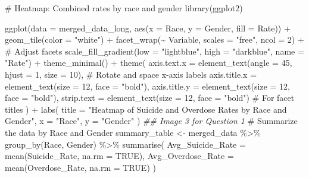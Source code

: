 \documentclass[
  letterpaper,
  DIV=11,
  numbers=noendperiod]{scrartcl}
\newenvironment{Shaded}{\begin{snugshade}}{\end{snugshade}}
\newcommand{\AttributeTok}[1]{\textcolor[rgb]{0.40,0.45,0.13}{#1}}
\newcommand{\CommentTok}[1]{\textcolor[rgb]{0.37,0.37,0.37}{#1}}
\newcommand{\ConstantTok}[1]{\textcolor[rgb]{0.56,0.35,0.01}{#1}}
\newcommand{\DecValTok}[1]{\textcolor[rgb]{0.68,0.00,0.00}{#1}}
\newcommand{\DocumentationTok}[1]{\textcolor[rgb]{0.37,0.37,0.37}{\textit{#1}}}
\newcommand{\FunctionTok}[1]{\textcolor[rgb]{0.28,0.35,0.67}{#1}}
\newcommand{\NormalTok}[1]{\textcolor[rgb]{0.00,0.23,0.31}{#1}}
\newcommand{\OtherTok}[1]{\textcolor[rgb]{0.00,0.23,0.31}{#1}}
\newcommand{\SpecialCharTok}[1]{\textcolor[rgb]{0.37,0.37,0.37}{#1}}
\newcommand{\StringTok}[1]{\textcolor[rgb]{0.13,0.47,0.30}{#1}}
\begin{document}
\begin{Shaded}
\begin{Highlighting}[]
\CommentTok{\# Heatmap: Combined rates by race and gender}
\FunctionTok{library}\NormalTok{(ggplot2)}

\FunctionTok{ggplot}\NormalTok{(}\AttributeTok{data =}\NormalTok{ merged\_data\_long, }\FunctionTok{aes}\NormalTok{(}\AttributeTok{x =}\NormalTok{ Race, }\AttributeTok{y =}\NormalTok{ Gender, }\AttributeTok{fill =}\NormalTok{ Rate)) }\SpecialCharTok{+}
  \FunctionTok{geom\_tile}\NormalTok{(}\AttributeTok{color =} \StringTok{"white"}\NormalTok{) }\SpecialCharTok{+}
  \FunctionTok{facet\_wrap}\NormalTok{(}\SpecialCharTok{\textasciitilde{}}\NormalTok{ Variable, }\AttributeTok{scales =} \StringTok{"free"}\NormalTok{, }\AttributeTok{ncol =} \DecValTok{2}\NormalTok{) }\SpecialCharTok{+} \CommentTok{\# Adjust facets}
  \FunctionTok{scale\_fill\_gradient}\NormalTok{(}\AttributeTok{low =} \StringTok{"lightblue"}\NormalTok{, }\AttributeTok{high =} \StringTok{"darkblue"}\NormalTok{, }\AttributeTok{name =} \StringTok{"Rate"}\NormalTok{) }\SpecialCharTok{+}
  \FunctionTok{theme\_minimal}\NormalTok{() }\SpecialCharTok{+}
  \FunctionTok{theme}\NormalTok{(}
    \AttributeTok{axis.text.x =} \FunctionTok{element\_text}\NormalTok{(}\AttributeTok{angle =} \DecValTok{45}\NormalTok{, }\AttributeTok{hjust =} \DecValTok{1}\NormalTok{, }\AttributeTok{size =} \DecValTok{10}\NormalTok{), }\CommentTok{\# Rotate and space x{-}axis labels}
    \AttributeTok{axis.title.x =} \FunctionTok{element\_text}\NormalTok{(}\AttributeTok{size =} \DecValTok{12}\NormalTok{, }\AttributeTok{face =} \StringTok{"bold"}\NormalTok{),}
    \AttributeTok{axis.title.y =} \FunctionTok{element\_text}\NormalTok{(}\AttributeTok{size =} \DecValTok{12}\NormalTok{, }\AttributeTok{face =} \StringTok{"bold"}\NormalTok{),}
    \AttributeTok{strip.text =} \FunctionTok{element\_text}\NormalTok{(}\AttributeTok{size =} \DecValTok{12}\NormalTok{, }\AttributeTok{face =} \StringTok{"bold"}\NormalTok{) }\CommentTok{\# For facet titles}
\NormalTok{  ) }\SpecialCharTok{+}
  \FunctionTok{labs}\NormalTok{(}
    \AttributeTok{title =} \StringTok{"Heatmap of Suicide and Overdose Rates by Race and Gender"}\NormalTok{,}
    \AttributeTok{x =} \StringTok{"Race"}\NormalTok{,}
    \AttributeTok{y =} \StringTok{"Gender"}
\NormalTok{  )}
\DocumentationTok{\#\# Image 3 for Question 1}
\CommentTok{\# Summarize the data by Race and Gender}
\NormalTok{summary\_table }\OtherTok{\textless{}{-}}\NormalTok{ merged\_data }\SpecialCharTok{\%\textgreater{}\%}
  \FunctionTok{group\_by}\NormalTok{(Race, Gender) }\SpecialCharTok{\%\textgreater{}\%}
  \FunctionTok{summarise}\NormalTok{(}
    \AttributeTok{Avg\_Suicide\_Rate =} \FunctionTok{mean}\NormalTok{(Suicide\_Rate, }\AttributeTok{na.rm =} \ConstantTok{TRUE}\NormalTok{),}
    \AttributeTok{Avg\_Overdose\_Rate =} \FunctionTok{mean}\NormalTok{(Overdose\_Rate, }\AttributeTok{na.rm =} \ConstantTok{TRUE}\NormalTok{)}
\NormalTok{  )}


\end{Highlighting}
\end{Shaded}
\end{document}
